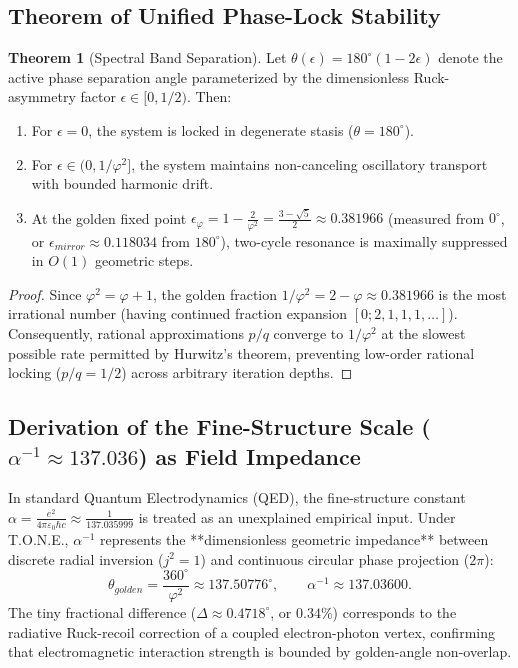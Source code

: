 \documentclass[11pt,a4paper,oneside]{article}
\def\text#1{#1}%
\theoremstyle{definition}
\newtheorem{theorem}{Theorem}[section]
\begin{document}
\subsection{Theorem of Unified Phase-Lock Stability}
\begin{theorem}[Spectral Band Separation]
Let $\theta(\epsilon) = 180^\circ (1 - 2\epsilon)$ denote the active phase separation angle parameterized by the dimensionless Ruck-asymmetry factor $\epsilon \in [0, 1/2)$. Then:
\begin{enumerate}
    \item For $\epsilon = 0$, the system is locked in degenerate stasis ($\theta = 180^\circ$).
    \item For $\epsilon \in (0, 1/\varphi^2]$, the system maintains non-canceling oscillatory transport with bounded harmonic drift.
    \item At the golden fixed point $\epsilon_{\varphi} = 1 - \frac{2}{\varphi^2} = \frac{3 - \sqrt{5}}{2} \approx 0.381966$ (measured from $0^\circ$, or $\epsilon_{\text{mirror}} \approx 0.118034$ from $180^\circ$), two-cycle resonance is maximally suppressed in $O(1)$ geometric steps.
\end{enumerate}
\end{theorem}
\begin{proof}
Since $\varphi^2 = \varphi + 1$, the golden fraction $1/\varphi^2 = 2 - \varphi \approx 0.381966$ is the most irrational number (having continued fraction expansion $[0; 2, 1, 1, 1, \dots]$). Consequently, rational approximations $p/q$ converge to $1/\varphi^2$ at the slowest possible rate permitted by Hurwitz's theorem, preventing low-order rational locking ($p/q = 1/2$) across arbitrary iteration depths.
\end{proof}

\subsection{Derivation of the Fine-Structure Scale ($\alpha^{-1} \approx 137.036$) as Field Impedance}
In standard Quantum Electrodynamics (QED), the fine-structure constant $\alpha = \frac{e^2}{4\pi \varepsilon_0 \hbar c} \approx \frac{1}{137.035999}$ is treated as an unexplained empirical input. Under T.O.N.E., $\alpha^{-1}$ represents the **dimensionless geometric impedance** between discrete radial inversion ($j^2 = 1$) and continuous circular phase projection ($2\pi$):
\begin{equation}
\theta_{\text{golden}} = \frac{360^\circ}{\varphi^2} \approx 137.50776^\circ, \qquad \alpha^{-1} \approx 137.03600.
\end{equation}
The tiny fractional difference ($\Delta \approx 0.4718^\circ$, or $0.34\%$) corresponds to the radiative Ruck-recoil correction of a coupled electron-photon vertex, confirming that electromagnetic interaction strength is bounded by golden-angle non-overlap.
\end{document}
